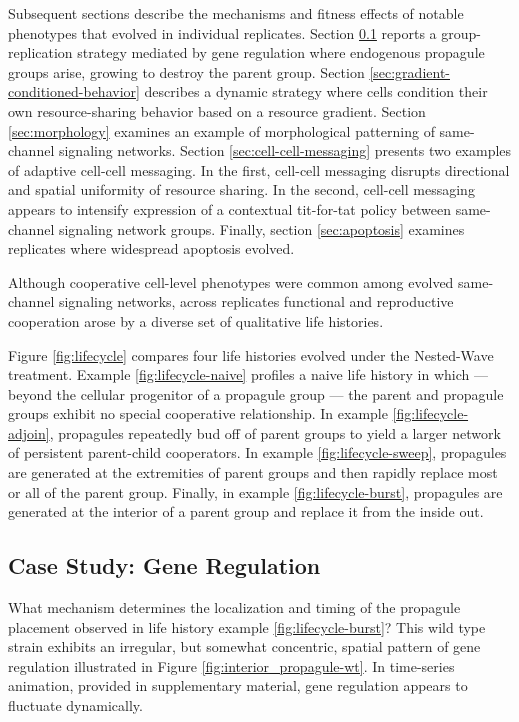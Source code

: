 Subsequent sections describe the mechanisms and fitness effects of notable phenotypes that evolved in individual replicates.
Section \ref{sec:gene-regulation} reports a group-replication strategy mediated by gene regulation where endogenous propagule groups arise, growing to destroy the parent group.
Section \ref{sec:gradient-conditioned-behavior} describes a dynamic strategy where cells condition their own resource-sharing behavior based on a resource gradient.
Section \ref{sec:morphology} examines an example of morphological patterning of same-channel signaling networks.
Section \ref{sec:cell-cell-messaging} presents two examples of adaptive cell-cell messaging.
In the first, cell-cell messaging disrupts directional and spatial uniformity of resource sharing.
In the second, cell-cell messaging appears to intensify expression of a contextual tit-for-tat policy between same-channel signaling network groups.
Finally, section \ref{sec:apoptosis} examines replicates where widespread apoptosis evolved.

Although cooperative cell-level phenotypes were common among evolved same-channel signaling networks, across replicates functional and reproductive cooperation arose by a diverse set of qualitative life histories.

Figure \ref{fig:lifecycle} compares four life histories evolved under the Nested-Wave treatment.
Example \ref{fig:lifecycle-naive} profiles a naive life history in which --- beyond the cellular progenitor of a propagule group --- the parent and propagule groups exhibit no special cooperative relationship.
In example \ref{fig:lifecycle-adjoin}, propagules repeatedly bud off of parent groups to yield a larger network of persistent parent-child cooperators.
In example \ref{fig:lifecycle-sweep}, propagules are generated at the extremities of parent groups and then rapidly replace most or all of the parent group.
Finally, in example \ref{fig:lifecycle-burst}, propagules are generated at the interior of a parent group and replace it from the inside out.

\subsection{Case Study: Gene Regulation} \label{sec:gene-regulation}



What mechanism determines the localization and timing of the propagule placement observed in life history example \ref{fig:lifecycle-burst}?
This wild type strain exhibits an irregular, but somewhat concentric, spatial pattern of gene regulation illustrated in Figure \ref{fig:interior_propagule-wt}.
In time-series animation, provided in supplementary material, gene regulation appears to fluctuate dynamically.

